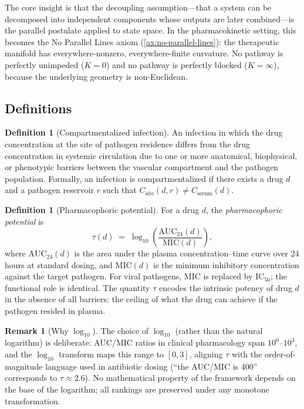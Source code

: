 \documentclass[11pt]{article}
\theoremstyle{plain}
\theoremstyle{definition}
\newtheorem{definition}[theorem]{Definition}
\newtheorem{remark}[theorem]{Remark}
\newcommand{\Csite}{C_{\mathrm{site}}}
\newcommand{\Cserum}{C_{\mathrm{serum}}}
\newcommand{\AUCday}{\mathrm{AUC}_{24}}
\newcommand{\MICval}{\mathrm{MIC}}
\begin{document}
The core insight is that the decoupling assumption---that a system
can be decomposed into independent components whose outputs are
later combined---is the parallel postulate applied to state space.
In the pharmacokinetic setting, this becomes the No Parallel Lines
axiom (\cref{ax:no-parallel-lines}): the therapeutic manifold has
everywhere-nonzero, everywhere-finite curvature. No pathway is
perfectly unimpeded ($K=0$) and no pathway is perfectly blocked
($K=\infty$), because the underlying geometry is non-Euclidean.

\subsection{Definitions}
\label{sec:definitions}

\begin{definition}[Compartmentalized infection]
\label{def:compartment}
An infection in which the drug concentration at the site of
pathogen residence differs from the drug concentration in
systemic circulation due to one or more anatomical, biophysical,
or phenotypic barriers between the vascular compartment and the
pathogen population. Formally, an infection is compartmentalized
if there exists a drug $d$ and a pathogen reservoir $r$ such that
$\Csite(d, r) \neq \Cserum(d)$.
\end{definition}

\begin{definition}[Pharmacophoric potential]
\label{def:tau}
For a drug $d$, the \emph{pharmacophoric potential} is
\begin{equation}
  \label{eq:tau}
  \tau(d) \;=\; \log_{10}\!\left(\frac{\AUCday(d)}{\MICval(d)}\right),
\end{equation}
where $\AUCday(d)$ is the area under the plasma
concentration--time curve over 24 hours at standard dosing, and
$\MICval(d)$ is the minimum inhibitory concentration against the
target pathogen. For viral pathogens, $\MICval$ is replaced by
$\mathrm{IC}_{50}$; the functional role is identical. The quantity
$\tau$ encodes the intrinsic potency of drug $d$ in the absence
of all barriers: the ceiling of what the drug can achieve if the
pathogen resided in plasma.
\end{definition}

\begin{remark}[Why $\log_{10}$]
\label{rem:log10}
The choice of $\log_{10}$ (rather than the natural logarithm)
is deliberate: AUC/MIC ratios in clinical pharmacology span
$10^0$--$10^3$, and the $\log_{10}$ transform maps this range
to $[0, 3]$, aligning $\tau$ with the order-of-magnitude language
used in antibiotic dosing (``the AUC/MIC is 400'' corresponds to
$\tau \approx 2.6$). No mathematical property of the framework
depends on the base of the logarithm; all rankings are preserved
under any monotone transformation.
\end{remark}
\end{document}
